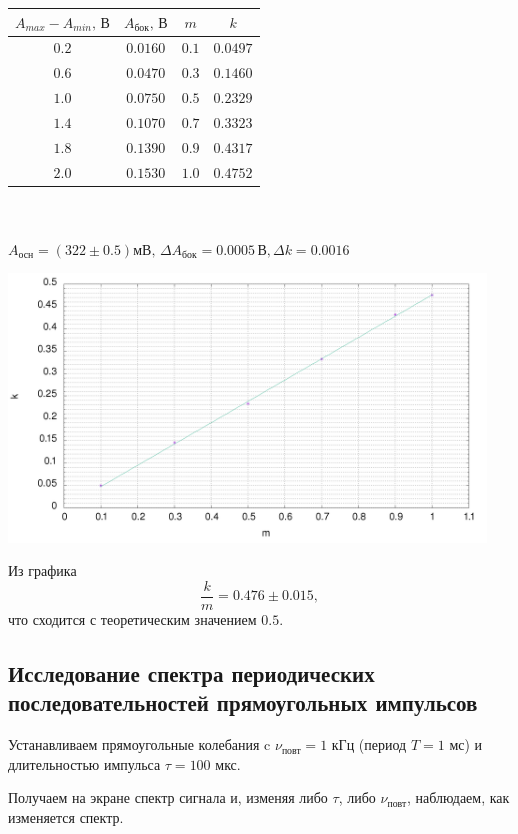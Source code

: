 \documentclass[a4paper,12pt]{article} %
\begin{document}
\begin{center}
\begin{tabular}{|c|c|c|c|}\hline
$A_{max}-A_{min}\text{, В}$&$A_\text{бок}\text{, В}$&$m$&$k$\\\hline
$0.2$&$0.0160$&$0.1$&$0.0497$\\\hline
$0.6$&$0.0470$&$0.3$&$0.1460$\\\hline
$1.0$&$0.0750$&$0.5$&$0.2329$\\\hline
$1.4$&$0.1070$&$0.7$&$0.3323$\\\hline
$1.8$&$0.1390$&$0.9$&$0.4317$\\\hline
$2.0$&$0.1530$&$1.0$&$0.4752$\\\hline
\end{tabular}\\~\\
$A_\text{осн} = (322\pm0.5)\text{мВ},\,\Delta A_\text{бок}=0.0005\,\text{В},\Delta k=0.0016\,\text{}$
\end{center}
\begin{center}
\includegraphics[width=0.95\textwidth]{plot2.png}
\end{center}
Из графика
$$\frac{k}{m} = 0.476\pm0.015,$$
что сходится с теоретическим значением $0.5$.
\subsection{Исследование спектра периодических последовательностей прямоугольных импульсов}
Устанавливаем прямоугольные колебания c $\nu_{\text{повт}} = 1$ кГц (период $T = 1$ мс) и длительностью импульса $\tau = 100$ мкс.

Получаем на экране спектр сигнала и, изменяя либо $\tau$, либо $\nu_{\text{повт}}$, наблюдаем, как изменяется спектр.
\end{document}
